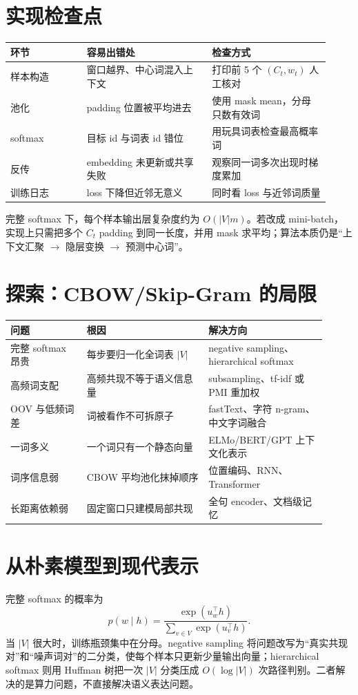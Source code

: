 \documentclass[UTF8,10pt,a4paper,fontset=none]{ctexart}
\begin{document}
\section{实现检查点}
\small
\begin{tabular}{@{}p{0.22\linewidth}p{0.36\linewidth}p{0.34\linewidth}@{}}
\toprule
环节 & 容易出错处 & 检查方式 \\
\midrule
样本构造 & 窗口越界、中心词混入上下文 & 打印前 5 个 $(C_t,w_t)$ 人工核对 \\
池化 & padding 位置被平均进去 & 使用 mask mean，分母只数有效词 \\
softmax & 目标 id 与词表 id 错位 & 用玩具词表检查最高概率词 \\
反传 & embedding 未更新或共享失败 & 观察同一词多次出现时梯度累加 \\
训练日志 & loss 下降但近邻无意义 & 同时看 loss 与近邻词质量 \\
\bottomrule
\end{tabular}
\normalsize

完整 softmax 下，每个样本输出层复杂度约为 $O(|V|m)$。若改成 mini-batch，实现上只需把多个 $C_t$ padding 到同一长度，并用 mask 求平均；算法本质仍是“上下文汇聚 $\rightarrow$ 隐层变换 $\rightarrow$ 预测中心词”。

\clearpage

\section{探索：CBOW/Skip-Gram 的局限}
\small
\begin{tabular}{@{}p{0.22\linewidth}p{0.35\linewidth}p{0.34\linewidth}@{}}
\toprule
问题 & 根因 & 解决方向 \\
\midrule
完整 softmax 昂贵 & 每步要归一化全词表 $|V|$ & negative sampling、hierarchical softmax \\
高频词支配 & 高频共现不等于语义信息量 & subsampling、tf-idf 或 PMI 重加权 \\
OOV 与低频词差 & 词被看作不可拆原子 & fastText、字符 n-gram、中文字词融合 \\
一词多义 & 一个词只有一个静态向量 & ELMo/BERT/GPT 上下文化表示 \\
词序信息弱 & CBOW 平均池化抹掉顺序 & 位置编码、RNN、Transformer \\
长距离依赖弱 & 固定窗口只建模局部共现 & 全句 encoder、文档级记忆 \\
\bottomrule
\end{tabular}
\normalsize

\section{从朴素模型到现代表示}
完整 softmax 的概率为
\[
p(w\mid h)=\frac{\exp(u_w^\top h)}{\sum_{v\in V}\exp(u_v^\top h)}.
\]
当 $|V|$ 很大时，训练瓶颈集中在分母。negative sampling 将问题改写为“真实共现对”和“噪声词对”的二分类，使每个样本只更新少量输出向量；hierarchical softmax 则用 Huffman 树把一次 $|V|$ 分类压成 $O(\log |V|)$ 次路径判别。二者解决的是算力问题，不直接解决语义表达问题。
\end{document}
